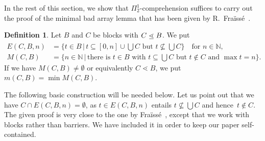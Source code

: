 \documentclass{amsart}
\numberwithin{theorem}{section}
\theoremstyle{definition}
\newtheorem{definition}[theorem]{Definition}
\newcommand\ledot{\mathrel{\ensurestackMath{%
  \stackengine{-.5ex}{\lessdot}{-}{U}{c}{F}{F}{S}}}}
\newcommand{\base}[1]{\textstyle\bigcup #1}
\newcommand{\barrsucc}[2]{#1 \ledot #2}
\begin{document}
In the rest of this section, we show that $\Pi^1_2$-comprehension suffices to carry out the proof of the minimal bad array lemma that has been given by R.~Fra\"iss\'e~\cite{fraisse-theory-relations}.

\begin{definition}
    Let $B$ and $C$ be blocks with $\barrsucc{C}{B}$. We put
    \begin{align*}
        E(C,B,n)&=\{t\in B\,|\,t\subseteq[0,n]\cup \base C\text{ but }t\not\subseteq\base C\}\quad\text{for $n\in\mathbb N$},\\
        M(C,B)&=\{n\in\mathbb N\,|\,\text{there is }t\in B\text{ with }t\subseteq \base C\text{ but }t\not\in C\text{ and }\max t=n\}.
    \end{align*}
    If we have $M(C,B)\neq\emptyset$ or equivalently $C\lessdot B$, we put $m(C,B)=\min M(C,B)$.
\end{definition}

The following basic construction will be needed below. Let us point out that we have $C\cap E(C,B,n)=\emptyset$, as $t\in E(C,B,n)$ entails $t\not\subseteq\bigcup C$ and hence~$t\notin C$. The given proof is very close to the one by Fra{\"i}ss\'e~\cite{fraisse-theory-relations}, except that we work with blocks rather than barriers. We have included it in order to keep our paper self-contained.
\end{document}
